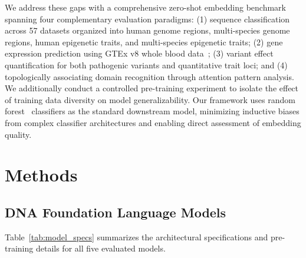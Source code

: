 \documentclass[11pt]{article}
\begin{document}
We address these gaps with a comprehensive zero-shot embedding benchmark spanning four complementary evaluation paradigms: (1) sequence classification across 57 datasets organized into human genome regions, multi-species genome regions, human epigenetic traits, and multi-species epigenetic traits; (2) gene expression prediction using GTEx v8 whole blood data~\citep{gtex2020atlas}; (3) variant effect quantification for both pathogenic variants and quantitative trait loci; and (4) topologically associating domain recognition through attention pattern analysis. We additionally conduct a controlled pre-training experiment to isolate the effect of training data diversity on model generalizability. Our framework uses random forest~\citep{breiman2001random} classifiers as the standard downstream model, minimizing inductive biases from complex classifier architectures and enabling direct assessment of embedding quality.

\section{Methods}

\subsection{DNA Foundation Language Models}

Table~\ref{tab:model_specs} summarizes the architectural specifications and pre-training details for all five evaluated models.
\end{document}
